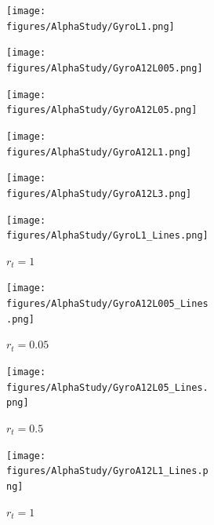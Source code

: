 \begin{figure}[ht]
    \centering
    \begin{subfigure}{\textwidth}
        \begin{subfigure}{.19\textwidth}
            \centering
            \texttt{[image: figures/AlphaStudy/GyroL1.png]}
        \end{subfigure}
        \begin{subfigure}{.19\textwidth}
            \centering
            \texttt{[image: figures/AlphaStudy/GyroA12L005.png]}
        \end{subfigure}
        \begin{subfigure}{.19\textwidth}
            \centering
            \texttt{[image: figures/AlphaStudy/GyroA12L05.png]}
        \end{subfigure}
        \begin{subfigure}{.19\textwidth}
            \centering
            \texttt{[image: figures/AlphaStudy/GyroA12L1.png]}
        \end{subfigure}
        \begin{subfigure}{.19\textwidth}
            \centering
            \texttt{[image: figures/AlphaStudy/GyroA12L3.png]}
        \end{subfigure}
    \end{subfigure}
    \begin{subfigure}{\textwidth}
        \begin{subfigure}{.19\textwidth}
            \centering
            \texttt{[image: figures/AlphaStudy/GyroL1\_Lines.png]}
            \caption*{$r_t=1$}
        \end{subfigure}
        \begin{subfigure}{.19\textwidth}
            \centering
            \texttt{[image: figures/AlphaStudy/GyroA12L005\_Lines.png]}
            \caption*{$r_t=0.05$}
        \end{subfigure}
        \begin{subfigure}{.19\textwidth}
            \centering
            \texttt{[image: figures/AlphaStudy/GyroA12L05\_Lines.png]}
            \caption*{$r_t=0.5$}
        \end{subfigure}
        \begin{subfigure}{.19\textwidth}
            \centering
            \texttt{[image: figures/AlphaStudy/GyroA12L1\_Lines.png]}
            \caption*{$r_t=1$}
        \end{subfigure}
        \begin{subfigure}{.19\textwidth}
            \centering

\end{subfigure}
\end{subfigure}
\end{figure}
